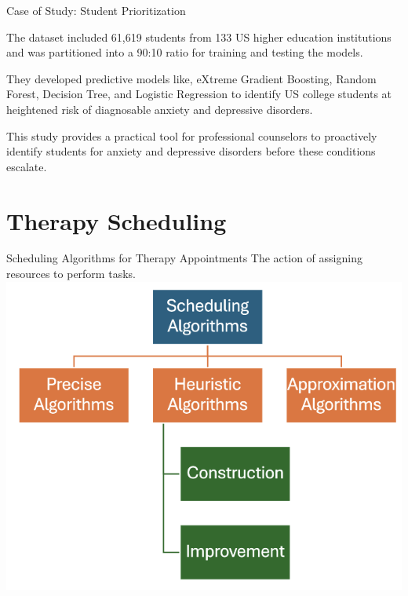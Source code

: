 \documentclass[10pt, xcolor=table]{beamer}
\begin{document}
\begin{frame}{Case of Study: Student Prioritization \cite{https://doi.org/10.1002/jcad.12543}}
	
	
	\begin{tcolorbox}[width=\textwidth, colback=myNewColorB, colframe=myNewColorA, boxrule=0.7mm, rounded corners]
		The dataset included 61,619 students from 133 US higher education institutions and was partitioned into a 90:10 ratio for training and testing the models. 
	\end{tcolorbox}
	
	\vspace{0.3cm}
	
	\begin{tcolorbox}[width=\textwidth, colback=myNewColorB, colframe=myNewColorA, boxrule=0.7mm, rounded corners]
		They developed predictive models like, eXtreme Gradient Boosting, Random Forest, Decision Tree, and Logistic Regression to identify US college students at heightened risk of diagnosable anxiety and depressive disorders.
	\end{tcolorbox}
	
	\vspace{0.3cm}
	
	\begin{tcolorbox}[width=\textwidth, colback=myNewColorB, colframe=myNewColorA, boxrule=0.7mm, rounded corners]
		This study provides a practical tool for professional counselors to proactively identify students for anxiety and depressive disorders before these conditions escalate.
	\end{tcolorbox}
	
\end{frame}

\section*{Therapy Scheduling}

\begin{frame}{Scheduling Algorithms for Therapy Appointments}
	The action of assigning resources to perform tasks.
	\centering
	\includegraphics[width=0.65\linewidth]{./figures/scheduling_types.png} %
	
\end{frame}
\end{document}
